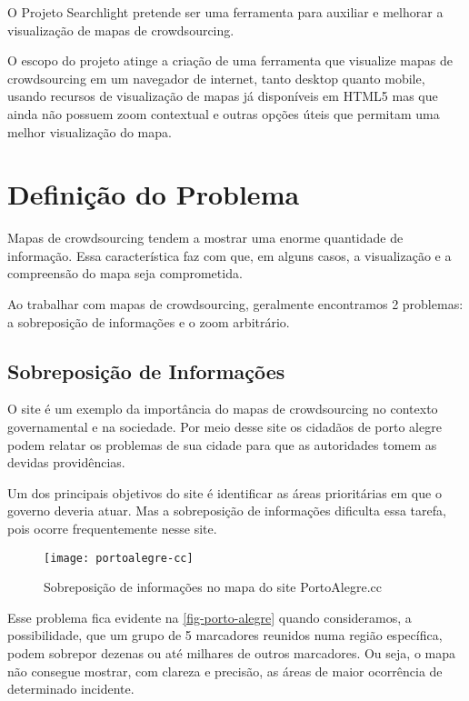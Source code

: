 O Projeto Searchlight pretende ser uma ferramenta para auxiliar e melhorar a visualização de mapas de crowdsourcing.

O escopo do projeto atinge a criação de uma ferramenta que visualize mapas de crowdsourcing em um navegador de internet, tanto desktop quanto mobile, usando recursos de visualização de mapas já disponíveis em HTML5 mas que ainda não possuem zoom contextual e outras opções úteis que permitam uma melhor visualização do mapa.



\section{Definição do Problema}
Mapas de crowdsourcing tendem a mostrar uma enorme quantidade de informação. Essa característica faz com que, em alguns casos, a visualização e a compreensão do mapa seja comprometida.
 
Ao trabalhar com mapas de crowdsourcing, geralmente encontramos 2 problemas: a sobreposição de informações e o zoom arbitrário. 



\subsection{Sobreposição de Informações}
O site  é um exemplo da importância do mapas de crowdsourcing no contexto governamental e na sociedade. Por meio desse site os cidadãos de porto alegre podem relatar os problemas de sua cidade para que as autoridades tomem as devidas providências. 

Um dos principais objetivos do site é identificar as áreas prioritárias em que o governo deveria atuar. Mas a sobreposição de informações dificulta essa tarefa, pois ocorre frequentemente nesse site. 

\begin{figure}[htb]
	\caption{\label{fig-porto-alegre} Sobreposição de informações no mapa do site PortoAlegre.cc}
	\begin{center}
	    \texttt{[image: portoalegre-cc]}
	\end{center}
\end{figure}

Esse problema fica evidente na \autoref{fig-porto-alegre} quando consideramos, a possibilidade, que um grupo de 5 marcadores reunidos numa região específica, podem sobrepor dezenas ou até milhares de outros marcadores. Ou seja, o mapa não consegue mostrar, com clareza e precisão, as áreas de maior ocorrência de determinado incidente. 

